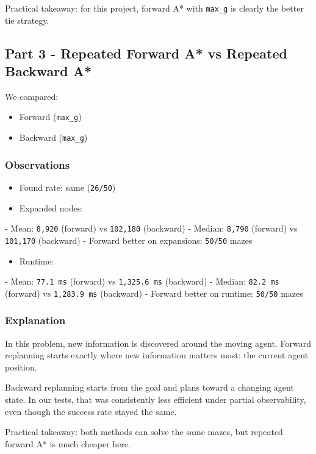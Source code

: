 \documentclass[11pt]{article}
\begin{document}
Practical takeaway: for this project, forward A* with \texttt{max\_g} is clearly the better tie strategy.

\subsection*{Part 3 - Repeated Forward A* vs Repeated Backward A*}

We compared:

\begin{itemize}[leftmargin=*]
\item Forward (\texttt{max\_g})
\item Backward (\texttt{max\_g})
\end{itemize}

\subsubsection*{Observations}

\begin{itemize}[leftmargin=*]
\item Found rate: same (\texttt{26/50})
\item Expanded nodes:
\end{itemize}
  - Mean: \texttt{8,920} (forward) vs \texttt{102,180} (backward)
  - Median: \texttt{8,790} (forward) vs \texttt{101,170} (backward)
  - Forward better on expansions: \texttt{50/50} mazes
\begin{itemize}[leftmargin=*]
\item Runtime:
\end{itemize}
  - Mean: \texttt{77.1 ms} (forward) vs \texttt{1,325.6 ms} (backward)
  - Median: \texttt{82.2 ms} (forward) vs \texttt{1,283.9 ms} (backward)
  - Forward better on runtime: \texttt{50/50} mazes

\subsubsection*{Explanation}

In this problem, new information is discovered around the moving agent. Forward replanning starts exactly where new information matters most: the current agent position.

Backward replanning starts from the goal and plans toward a changing agent state. In our tests, that was consistently less efficient under partial observability, even though the success rate stayed the same.

Practical takeaway: both methods can solve the same mazes, but repeated forward A* is much cheaper here.
\end{document}
